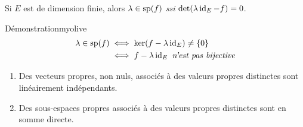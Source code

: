     \begin{prop}{}{}
        Si $E$ est de dimension finie, alors $\lambda \in \sp(f)$ \textit{ssi} $\det(\lambda \id_E - f) = 0$.
    \end{prop}

    \begin{demo}{Démonstration}{myolive}
        \begin{align*}
            \lambda \in \sp(f) 
            &\iff \ker(f - \lambda \id_E) \neq \{0\} \\
            &\iff f - \lambda \id_E \textit{ n’est pas bijective}
        \end{align*}
    \end{demo}

    \begin{prop}{}{}
        \begin{enumerate}
            \item Des vecteurs propres, non nuls, associés à des valeurs propres distinctes sont linéairement indépendants. 
            \item Des sous-espaces propres associés à des valeurs propres distinctes sont en somme directe.
        \end{enumerate}
    \end{prop}

